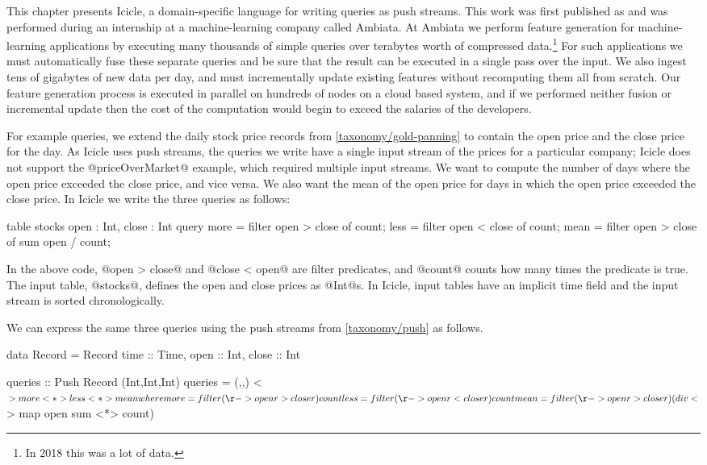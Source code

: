 \label{icicle:s:Introduction}

This chapter presents Icicle, a domain-specific language for writing queries as push streams.
This work was first published as \citep{robinson2016icicle} and was performed during an internship at a machine-learning company called Ambiata.
At Ambiata we perform feature generation for machine-learning applications by executing many thousands of simple queries over terabytes worth of compressed data.\footnote{In 2018 this was a lot of data.}
For such applications we must automatically fuse these separate queries and be sure that the result can be executed in a single pass over the input.
We also ingest tens of gigabytes of new data per day, and must incrementally update existing features without recomputing them all from scratch.
Our feature generation process is executed in parallel on hundreds of nodes on a cloud based system, and if we performed neither fusion or incremental update then the cost of the computation would begin to exceed the salaries of the developers.

For example queries, we extend the daily stock price records from \autoref{taxonomy/gold-panning} to contain the open price and the close price for the day.
As Icicle uses push streams, the queries we write have a single input stream of the prices for a particular company; Icicle does not support the @priceOverMarket@ example, which required multiple input streams.
We want to compute the number of days where the open price exceeded the close price, and vice versa.
We also want the mean of the open price for days in which the open price exceeded the close price.
In Icicle we write the three queries as follows:

\begin{icicle}
table stocks { open : Int, close : Int }
query 
  more = filter open > close of count;
  less = filter open < close of count;
  mean = filter open > close of sum open / count;
\end{icicle}

In the above code, @open > close@ and @close < open@ are filter predicates, and @count@ counts how many times the predicate is true.
The input table, @stocks@, defines the open and close prices as @Int@s.
In Icicle, input tables have an implicit time field and the input stream is sorted chronologically.

We can express the same three queries using the push streams from \autoref{taxonomy/push} as follows.

\begin{haskell}
data Record = Record
 { time :: Time, open :: Int, close :: Int }

queries :: Push Record (Int,Int,Int)
queries = (,,) <$> more <*> less <*> mean
 where
  more = filter (\r -> open r > close r) count
  less = filter (\r -> open r < close r) count
  mean = filter (\r -> open r > close r) (div <$> map open sum <*> count)
\end{haskell}

